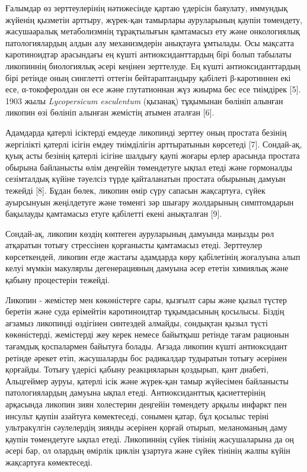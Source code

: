 \begin{multicols}{2}
Ғалымдар өз зерттеулерінің нәтижесінде қартаю үдерісін баяулату,
иммундық жүйенің қызметін арттыру, жүрек-қан тамырлары ауруларының
қаупін төмендету, жасушааралық метаболизмнің тұрақтылығын қамтамасыз ету
және онкологиялық патологиялардың алдын алу механизмдерін анықтауға
ұмтылады. Осы мақсатта каротиноидтар арасындағы ең күшті
антиоксиданттардың бірі болып табылаты ликопиннің биологиялық әсері
кеңінен зерттелуде. Ең күшті антиоксиданттардың бірі ретінде оның
синглетті оттегін бейтараптандыру қабілеті β-каротиннен екі есе,
α-токоферолдан он есе және глутатионнан жүз жиырма бес есе тиімдірек
{[}5{]}. 1903 жылы \emph{Lycopersicum esculentum} (қызанақ) тұқымынан
бөлініп алынған ликопин өзі бөлініп алынған жемістің атымен аталған
{[}6{]}.

Адамдарда қатерлі ісіктерді емдеуде ликопинді зерттеу оның простата
безінің жергілікті қатерлі ісігін емдеу тиімділігін арттыратынын
көрсетеді {[}7{]}. Сондай-ақ, қуық асты безінің қатерлі ісігіне шалдығу
қаупі жоғары ерлер арасында простата обырына байланысты өлім деңгейін
төмендетуге ықпал етеді және гормоналды сезімталдық күйіне тәуелсіз
түрде қайталанатын простата обырының дамуын тежейді {[}8{]}. Бұдан
бөлек, ликопин өмір сүру сапасын жақсартуға, сүйек ауырсынуын
жеңілдетуге және төменгі зәр шығару жолдарының симптомдарын бақылауды
қамтамасыз етуге қабілетті екені анықталған {[}9{]}.

Сондай-ақ, ликопин көздің көптеген ауруларының дамуында маңызды рөл
атқаратын тотығу стрессінен қорғанысты қамтамасыз етеді. Зерттеулер
көрсеткендей, ликопин егде жастағы адамдарда көру қабілетінің жоғалуына
алып келуі мүмкін макулярлы дегенерацияның дамуына әсер ететін химиялық
және қабыну процестерін тежейді.

Ликопин - жемістер мен көкөністерге сары, қызғылт сары және қызыл түстер
беретін және суда ерімейтін каротиноидтар тұқымдасының қосылысы. Біздің
ағзамыз ликопинді өздігінен синтездей алмайды, сондықтан қызыл түсті
көкөністерді, жемістерді жеу керек немесе байытқыш ретінде тағам
рационын тағамдық қоспалармен байытуға болады. Ағзада ликопин күшті
антиоксидант ретінде әрекет етіп, жасушаларды бос радикалдар тудыратын
тотығу әсерінен қорғайды. Тотығу үдерісі қабыну реакцияларын қоздырып,
қант диабеті, Альцгеймер ауруы, қатерлі ісік және жүрек-қан тамыр
жүйесімен байланысты патологиялардың дамуына ықпал етеді.
Антиоксиданттық қасиеттерінің арқасында ликопин зиян холестерин деңгейін
төмендету арқылы инфаркт пен инсульт қаупін азайтуға көмектеседі,
сонымен қатар, бұл қосылыс теріні ультракүлгін сәулелердің зиянды
әсерінен қорғай отырып, меланоманың даму қаупін төмендетуге ықпал етеді.
Ликопиннің сүйек тінінің жасушаларына да оң әсері бар, ол олардың
өмірлік циклін ұзартуға және сүйек тінінің жалпы күйін жақсартуға
көмектеседі.


\end{multicols}

